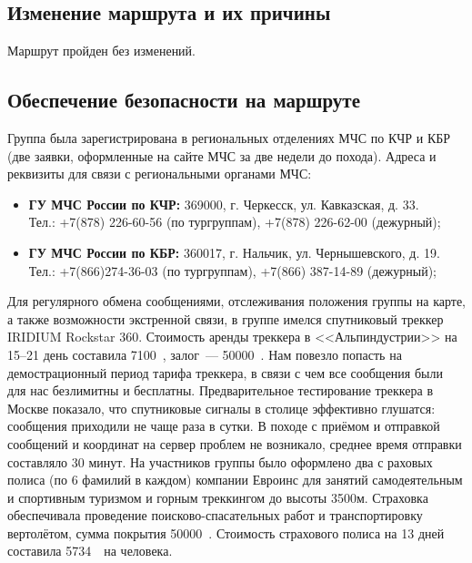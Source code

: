 \subsection{Изменение маршрута и их причины}
Маршрут пройден без изменений.
\subsection{Обеспечение безопасности на маршруте}
Группа была зарегистрирована в региональных отделениях МЧС по КЧР и КБР (две заявки, оформленные на сайте МЧС за две недели до похода).
Адреса и реквизиты для связи с региональными органами МЧС:
\begin{itemize}
	\item \textbf{ГУ МЧС России по КЧР:} 369000, г. Черкесск, ул. Кавказская, д. 33.\\
	Тел.: +7(878) 226-60-56 (по тургруппам), +7(878) 226-62-00 (дежурный);
	
	\item \textbf{ГУ МЧС России по КБР:} 360017, г. Нальчик, ул. Чернышевского, д. 19.\\
	Тел.: +7(866)274-36-03 (по тургруппам), +7(866) 387-14-89 (дежурный);	
\end{itemize}
Для регулярного обмена сообщениями, отслеживания положения группы на карте, а также возможности экстренной связи, в группе имелся спутниковый треккер IRIDIUM Rockstar 360. Стоимость аренды треккера в <<Альпиндустрии>> на 15--21 день составила 7100~\faRub, залог~--- 50000~\faRub. Нам повезло попасть на демострационный период тарифа треккера, в связи с чем все сообщения были для нас безлимитны и бесплатны. Предварительное тестирование треккера в Москве показало, что спутниковые сигналы в столице эффективно глушатся: сообщения приходили не чаще раза в сутки. В походе с приёмом и отправкой сообщений и координат на сервер проблем не возникало, среднее время отправки составляло 30 минут.
На участников группы было оформлено два с раховых полиса (по 6 фамилий в каждом) компании Евроинс для
занятий самодеятельным и спортивным туризмом и горным треккингом до высоты 3500м. Страховка обеспечивала проведение поисково-спасательных работ и транспортировку вертолётом, сумма покрытия 50000~\faEur. Стоимость страхового полиса на 13 дней составила 5734~\faRub~на человека.

